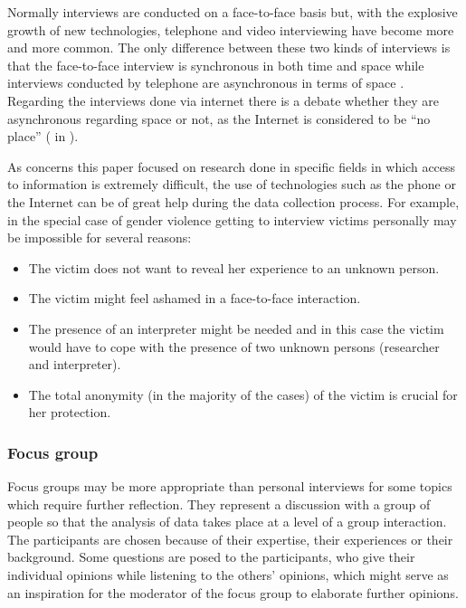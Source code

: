 \documentclass[output=paper]{LSP/langsci}
\begin{document}
Normally interviews are conducted on a face-to-face basis but, with the explosive growth of new technologies, telephone and video interviewing have become more and more common. The only difference between these two kinds of interviews is that the face-to-face interview is synchronous in both time and space while interviews conducted by telephone are asynchronous in terms of space \citep{Opdenakker2006}. Regarding the interviews done via internet there is a debate whether they are asynchronous regarding space or not, as the Internet is considered to be ``no place'' (\citealt{Morse1991} in \citealt{Opdenakker2006}).

As concerns this paper focused on research done in specific fields in which access to information is extremely difficult, the use of technologies such as the phone or the Internet can be of great help during the data collection process. For example, in the special case of gender violence getting to interview victims personally may be impossible for several reasons:

\begin{itemize}
\item The victim does not want to reveal her experience to an unknown person.
\item The victim might feel ashamed in a face-to-face interaction.
\item The presence of an interpreter might be needed and in this case the victim would have to cope with the presence of two unknown persons (researcher and interpreter).
\item The total anonymity (in the majority of the cases) of the victim is crucial for her protection.
\end{itemize}


\subsubsection{Focus group}


Focus groups may be more appropriate than personal interviews for some topics which require further reflection. They represent a discussion with a group of people so that the analysis of data takes place at a level of a group interaction. The participants are chosen because of their expertise, their experiences or their background. Some questions are posed to the participants, who give their individual opinions while listening to the others' opinions, which might serve as an inspiration for the moderator of the focus group to elaborate further opinions.
\end{document}
